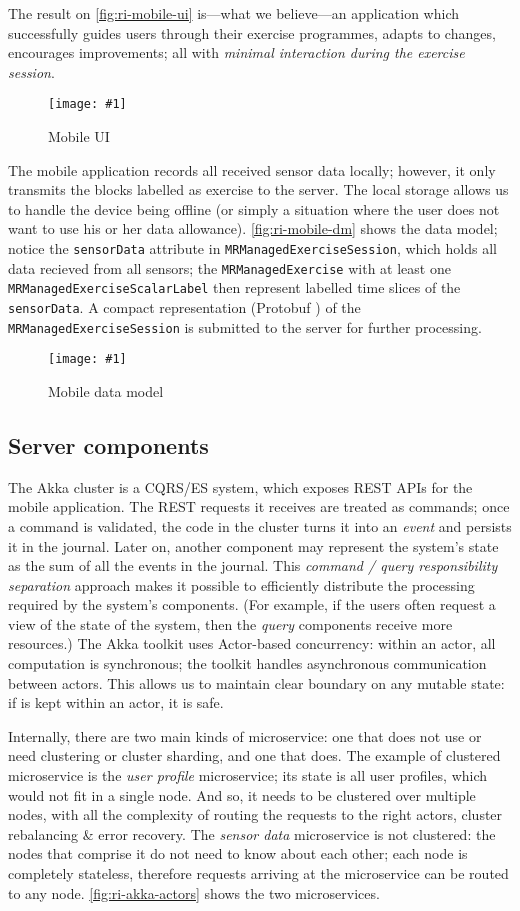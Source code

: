 \documentclass[a4paper, 10 pt, conference]{IEEEtran}
\def\lstinlinex{\lstinline[basicstyle=\itshape,keywordstyle={}]}
\newcommand{\fig}[3]{
  \begin{figure}[h]
    \begin{center}
        \caption{#3}
        \texttt{[image: \#1]}
        \label{fig:#2}
    \end{center}
  \end{figure}
}
\begin{document}
The result on \autoref{fig:ri-mobile-ui} is---what we believe---an application which successfully guides users through their exercise programmes, adapts to changes, encourages improvements; all with \emph{minimal interaction during the exercise session}. 

\fig{ri-mobile-ui.png}{ri-mobile-ui}{Mobile UI}

The mobile application records all received sensor data locally; however, it only transmits the blocks labelled as exercise to the server. The local storage allows us to handle the device being offline (or simply a situation where the user does not want to use his or her data allowance). \autoref{fig:ri-mobile-dm} shows the data model; notice the \lstinlinex{sensorData} attribute in \lstinlinex{MRManagedExerciseSession}, which holds all data recieved from all sensors; the \lstinlinex{MRManagedExercise} with at least one \lstinlinex{MRManagedExerciseScalarLabel} then represent labelled time slices of the \lstinlinex{sensorData}. A compact representation (Protobuf \cite{protobuf}) of the \lstinlinex{MRManagedExerciseSession} is submitted to the server for further processing.

\fig{ri-mobile-dm.png}{ri-mobile-dm}{Mobile data model}

\subsection{Server components}

The Akka cluster is a CQRS/ES system, which exposes REST APIs for the mobile application. The REST requests it receives are treated as commands; once a command is validated, the code in the cluster turns it into an \emph{event} and persists it in the journal. Later on, another component may represent the system's state as the sum of all the events in the journal. This \emph{command / query responsibility separation} approach makes it possible to efficiently distribute the processing required by the system's components. (For example, if the users often request a view of the state of the system, then the \emph{query} components receive more resources.) The Akka toolkit uses Actor-based concurrency: within an actor, all computation is synchronous; the toolkit handles asynchronous communication between actors. This allows us to maintain clear boundary on any mutable state: if is kept within an actor, it is safe. 

Internally, there are two main kinds of microservice: one that does not use or need clustering or cluster sharding, and one that does. The example of clustered microservice is the \emph{user profile} microservice; its state is all user profiles, which would not fit in a single node. And so, it needs to be clustered over multiple nodes, with all the complexity of routing the requests to the right actors, cluster rebalancing \& error recovery. The \emph{sensor data} microservice is not clustered: the nodes that comprise it do not need to know about each other; each node is completely stateless, therefore requests arriving at the microservice can be routed to any node. \autoref{fig:ri-akka-actors} shows the two microservices.
\end{document}
